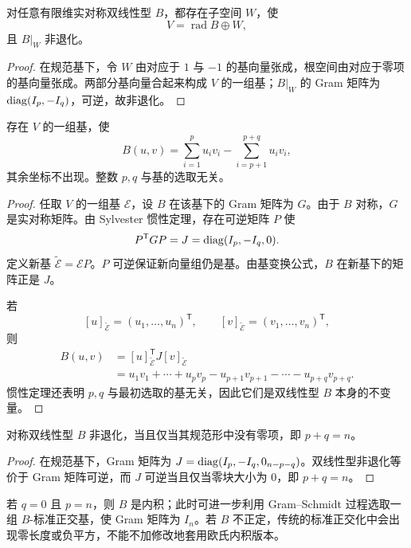\begin{corollary}[退化部分与非退化部分的分解]
对任意有限维实对称双线性型 $B$，都存在子空间 $W$，使
\[
V=\operatorname{rad}B\oplus W,
\]
且 $B|_W$ 非退化。
\end{corollary}
\begin{proof}
在规范基下，令 $W$ 由对应于 $1$ 与 $-1$ 的基向量张成，根空间由对应于零项的基向量张成。两部分基向量合起来构成 $V$ 的一组基；$B|_W$ 的 Gram 矩阵为 $\operatorname{diag}(I_p,-I_q)$，可逆，故非退化。
\end{proof}

\begin{theorem}[对称双线性型的规范形]
存在 $V$ 的一组基，使
\[
B(u,v)=\sum_{i=1}^p u_iv_i-\sum_{i=p+1}^{p+q}u_iv_i,
\]
其余坐标不出现。整数 $p,q$ 与基的选取无关。
\end{theorem}
\begin{proof}
任取 $V$ 的一组基 $\mathcal E$，设 $B$ 在该基下的 Gram 矩阵为 $G$。由于 $B$ 对称，$G$ 是实对称矩阵。由 Sylvester 惯性定理，存在可逆矩阵 $P$ 使
\[
P^{\mathsf T}GP=J=\operatorname{diag}(I_p,-I_q,0).
\]
定义新基 $\widetilde{\mathcal E}=\mathcal E P$。$P$ 可逆保证新向量组仍是基。由基变换公式，$B$ 在新基下的矩阵正是 $J$。

若
\[
[u]_{\widetilde{\mathcal E}}=(u_1,\ldots,u_n)^{\mathsf T},\qquad
[v]_{\widetilde{\mathcal E}}=(v_1,\ldots,v_n)^{\mathsf T},
\]
则
\begin{align*}
B(u,v)
&=[u]_{\widetilde{\mathcal E}}^{\mathsf T}
J[v]_{\widetilde{\mathcal E}}\\
&=u_1v_1+\cdots+u_pv_p
-u_{p+1}v_{p+1}-\cdots-u_{p+q}v_{p+q}.
\end{align*}
惯性定理还表明 $p,q$ 与最初选取的基无关，因此它们是双线性型 $B$ 本身的不变量。
\end{proof}

\begin{corollary}[退化性与零惯性指数]
对称双线性型 $B$ 非退化，当且仅当其规范形中没有零项，即 $p+q=n$。
\end{corollary}
\begin{proof}
在规范基下，Gram 矩阵为 $J=\operatorname{diag}(I_p,-I_q,0_{n-p-q})$。双线性型非退化等价于 Gram 矩阵可逆，而 $J$ 可逆当且仅当零块大小为 $0$，即 $p+q=n$。
\end{proof}

若 $q=0$ 且 $p=n$，则 $B$ 是内积；此时可进一步利用 Gram--Schmidt 过程选取一组 $B$-标准正交基，使 Gram 矩阵为 $I_n$。若 $B$ 不正定，传统的标准正交化中会出现零长度或负平方，不能不加修改地套用欧氏内积版本。

